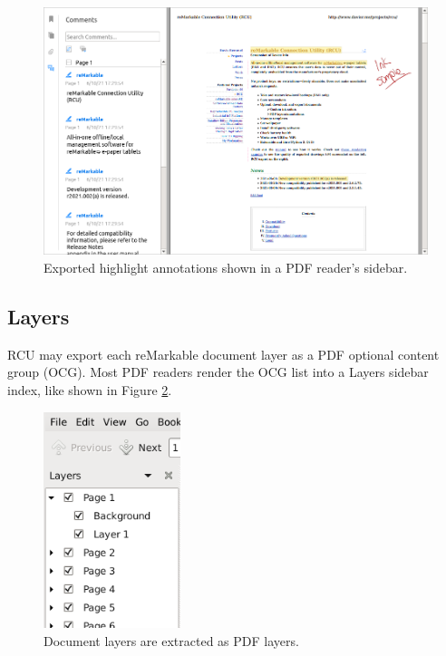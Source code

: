 \documentclass{memoir}
\begin{document}
{\begin{figure}[h]
  \includegraphics[width=\linewidth]{images/export-annot.png}
\caption{Exported highlight annotations shown in a PDF reader's sidebar.}
\label{fig:highlightannot}
\end{figure}





\subsection{Layers}
RCU may export each reMarkable document layer as a PDF optional content group (OCG). Most PDF readers render the OCG list into a Layers sidebar index, like shown in Figure \ref{fig:pdfocg}.


\begin{figure}[h]
  \centering
  \includegraphics[width=4cm]{images/export-ocg.png}
\caption{Document layers are extracted as PDF layers.}
\label{fig:pdfocg}
\end{figure}






}
\end{document}
